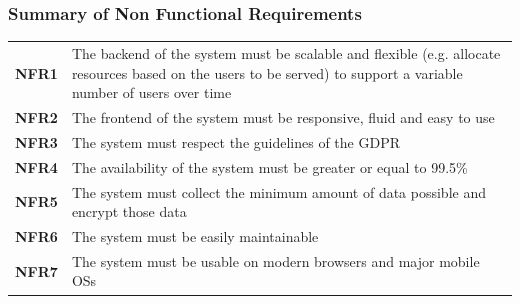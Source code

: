 \subsubsection*{Summary of Non Functional Requirements}
\begin{table}[H]
    \begin{tabularx}{\textwidth}{cX}
        \toprule
        \textbf{NFR1} & The backend of the system must be scalable and flexible (e.g. allocate resources based on the users to be served) to support a variable number of users over time \\
        \textbf{NFR2} & The frontend of the system must be responsive, fluid and easy to use                                                                                              \\
        \textbf{NFR3} & The system must respect the guidelines of the GDPR                                                                                                                \\
        \textbf{NFR4} & The availability of the system must be greater or equal to 99.5\%                                                                                                 \\
        \textbf{NFR5} & The system must collect the minimum amount of data possible and encrypt those data                                                                                \\
        \textbf{NFR6} & The system must be easily maintainable                                                                                                                            \\
        \textbf{NFR7} & The system must be usable on modern browsers and major mobile OSs                                                                                                 \\
        \bottomrule
    \end{tabularx}
\end{table}